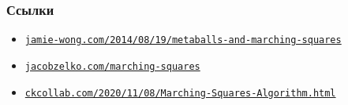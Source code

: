 \documentclass[10pt]{beamer}
\begin{document}
\begin{frame}[fragile]
\frametitle{Ссылки}
\fontsize{8pt}{8pt}\selectfont
\begin{itemize}
\item \href{http://jamie-wong.com/2014/08/19/metaballs-and-marching-squares}{\nolinkurl{jamie-wong.com/2014/08/19/metaballs-and-marching-squares}}\item \href{http://jacobzelko.com/marching-squares/}{\nolinkurl{jacobzelko.com/marching-squares}}
\item \href{https://ckcollab.com/2020/11/08/Marching-Squares-Algorithm.html}{\nolinkurl{ckcollab.com/2020/11/08/Marching-Squares-Algorithm.html}}
\end{itemize}
\end{frame}
\end{document}
